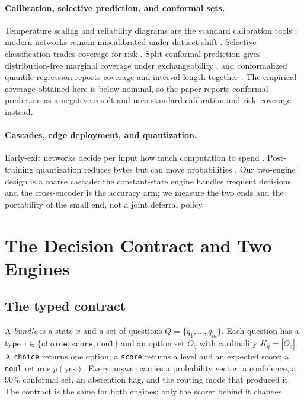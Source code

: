 \paragraph{Calibration, selective prediction, and conformal sets.}
Temperature scaling and reliability diagrams are the standard calibration tools \cite{guo2017calibration}; modern networks remain miscalibrated under dataset shift \cite{ovadia2019uncertainty}. Selective classification trades coverage for risk \cite{geifman2017selective,geifman2019selectivenet}. Split conformal prediction gives distribution-free marginal coverage under exchangeability \cite{lei2018distribution,angelopoulos2021gentle}, and conformalized quantile regression reports coverage and interval length together \cite{romano2019cqr}. The empirical coverage obtained here is below nominal, so the paper reports conformal prediction as a negative result and uses standard calibration and risk--coverage instead.

\paragraph{Cascades, edge deployment, and quantization.}
Early-exit networks decide per input how much computation to spend \cite{teerapittayanon2016branchynet,xin2020fastbert,zhou2020deebert}. Post-training quantization reduces bytes but can move probabilities \cite{dettmers2022llmint8,frantar2023gptq,xiao2023smoothquant}. Our two-engine design is a coarse cascade: the constant-state engine handles frequent decisions and the cross-encoder is the accuracy arm; we measure the two ends and the portability of the small end, not a joint deferral policy.

\section{The Decision Contract and Two Engines}
\label{sec:contract}

\subsection{The typed contract}
A \emph{bundle} is a state $x$ and a set of questions $Q=\{q_1,\dots,q_m\}$. Each question has a type $\tau\in\{\texttt{choice},\texttt{score},\texttt{noul}\}$ and an option set $O_q$ with cardinality $K_q=|O_q|$. A \texttt{choice} returns one option; a \texttt{score} returns a level and an expected score; a \texttt{noul} returns $p(\text{yes})$. Every answer carries a probability vector, a confidence, a 90\% conformal set, an abstention flag, and the routing mode that produced it. The contract is the same for both engines; only the scorer behind it changes.

